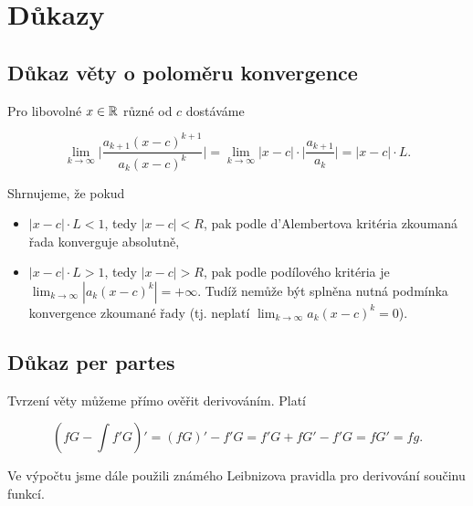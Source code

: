 \section{Důkazy}

\subsection*{Důkaz věty o poloměru konvergence}

Pro libovolné $x\in\mathbb{R}$ různé od $c$ dostáváme

\[ \lim_{k\to\infty} \bigg| \frac{a_{k+1} (x-c)^{k+1}}{a_k (x-c)^k} \bigg| = \lim_{k\to\infty} |x - c| \cdot \bigg| \frac{a_{k+1}}{a_k} \bigg| = |x - c| \cdot L. \]

\noindent Shrnujeme, že pokud
\begin{itemize}
    \item $|x - c| \cdot L < 1$, tedy $|x - c| < R$, pak podle d'Alembertova kritéria zkoumaná řada konverguje absolutně,
    \item $|x - c| \cdot L > 1$, tedy $|x - c| > R$, pak podle podílového kritéria je $\displaystyle\lim_{k\to\infty} |a_k (x-c)^k| = +\infty$. Tudíž nemůže být splněna nutná podmínka konvergence zkoumané řady (tj. neplatí $\displaystyle\lim_{k\to\infty} a_k (x-c)^k = 0$).
\end{itemize}

\subsection*{Důkaz per partes}

Tvrzení věty můžeme přímo ověřit derivováním. Platí

\[ \left( fG - \int f' G \right)' = (fG)' - f'G = f'G + fG' - f'G = fG' = fg. \]

\noindent Ve výpočtu jsme dále použili známého Leibnizova pravidla pro derivování součinu
funkcí.

\pagebreak
